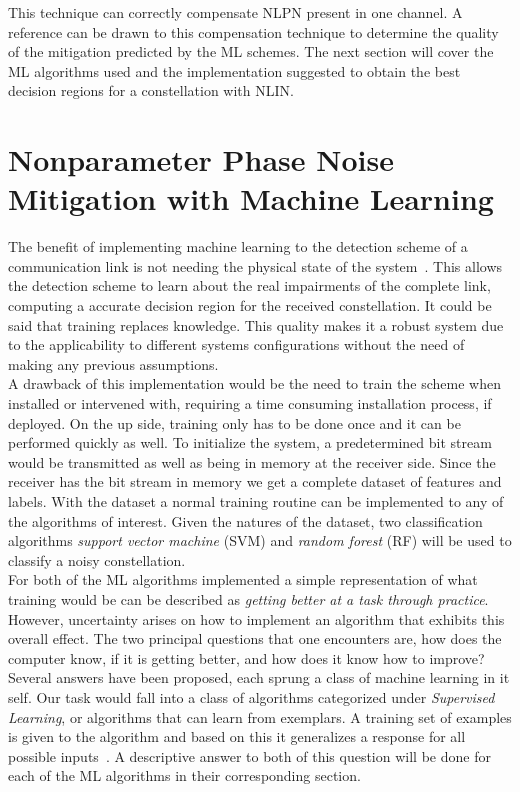 This technique  can correctly compensate NLPN present in one channel. A reference can be drawn to this compensation technique to determine the quality of the mitigation predicted by the ML schemes. The next section will cover the ML algorithms used and the implementation suggested to obtain the best decision regions for a constellation with NLIN. 
\section{Nonparameter Phase Noise Mitigation with Machine Learning  }

The benefit of implementing machine learning to the detection scheme of a communication link is not needing the physical state of the system~\cite{zibar2015application}. This allows the detection scheme to learn about the real impairments of the complete link, computing a accurate decision region for the received constellation. It could be said that training replaces knowledge. This quality makes it a robust system due to the applicability to different systems configurations without the need of making any previous assumptions.~\\

 A drawback of this implementation would be the need to train the scheme when installed or intervened with, requiring a time consuming installation process, if deployed. On the up side, training only has to be done once and it can be performed quickly as well. To initialize the system, a predetermined bit stream would be transmitted as well as being in memory at the receiver side. Since the receiver has the bit stream in memory we get a complete dataset of features and labels. With the dataset a normal training routine can be implemented to any of the algorithms of interest. Given the natures of the dataset, two classification algorithms \textit{support vector machine} (SVM) and \textit{random forest} (RF) will be used to classify a noisy constellation.~\\  


For both of the ML algorithms implemented a simple representation of what training would be can be described as \emph{getting better at a task through practice}. However, uncertainty arises on how to implement an algorithm that exhibits this overall effect. The two principal questions that one encounters are, how does the computer know, if it is getting better, and how does it know how to improve?  Several answers have been proposed, each sprung a class of machine learning in it self. Our task would fall into a class of algorithms categorized under \textit{Supervised Learning}, or algorithms that can learn from exemplars. A training set of examples is given to the algorithm and based on this it generalizes a response for all possible inputs~\cite{marsland2014machine}. A descriptive answer to both of this question will be done for each of the ML algorithms in their corresponding section.




